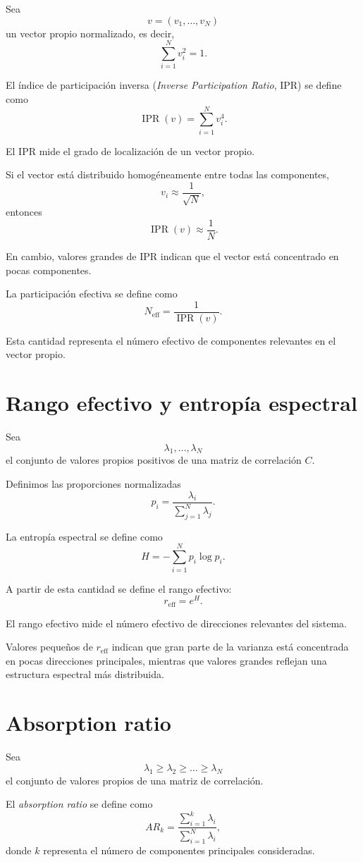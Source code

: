 \documentclass[letterpaper,12pt,oneside]{book}
\begin{document}
Sea
\[
v=(v_1,\dots,v_N)
\]
un vector propio normalizado, es decir,
\[
\sum_{i=1}^N v_i^2=1.
\]

El índice de participación inversa (\textit{Inverse Participation Ratio}, IPR) se define como
\[
\operatorname{IPR}(v)
=
\sum_{i=1}^N v_i^4.
\]

El IPR mide el grado de localización de un vector propio.

Si el vector está distribuido homogéneamente entre todas las componentes,
\[
v_i\approx\frac1{\sqrt N},
\]
entonces
\[
\operatorname{IPR}(v)\approx\frac1N.
\]

En cambio, valores grandes de IPR indican que el vector está concentrado en pocas componentes.

La participación efectiva se define como
\[
N_{\mathrm{eff}}
=
\frac1{\operatorname{IPR}(v)}.
\]

Esta cantidad representa el número efectivo de componentes relevantes en el vector propio.

\section{Rango efectivo y entropía espectral}

Sea
\[
\lambda_1,\dots,\lambda_N
\]
el conjunto de valores propios positivos de una matriz de correlación \(C\).

Definimos las proporciones normalizadas
\[
p_i
=
\frac{
\lambda_i
}{
\sum_{j=1}^N\lambda_j
}.
\]

La entropía espectral se define como
\[
H
=
-\sum_{i=1}^N
p_i\log p_i.
\]

A partir de esta cantidad se define el rango efectivo:
\[
r_{\mathrm{eff}}
=
e^H.
\]

El rango efectivo mide el número efectivo de direcciones relevantes del sistema.

Valores pequeños de \(r_{\mathrm{eff}}\) indican que gran parte de la varianza está concentrada en pocas direcciones principales, mientras que valores grandes reflejan una estructura espectral más distribuida.

\section{Absorption ratio}

Sea
\[
\lambda_1\geq\lambda_2\geq\dots\geq\lambda_N
\]
el conjunto de valores propios de una matriz de correlación.

El \textit{absorption ratio} se define como
\[
AR_k
=
\frac{
\sum_{i=1}^k\lambda_i
}{
\sum_{i=1}^N\lambda_i
},
\]
donde \(k\) representa el número de componentes principales consideradas.
\end{document}
